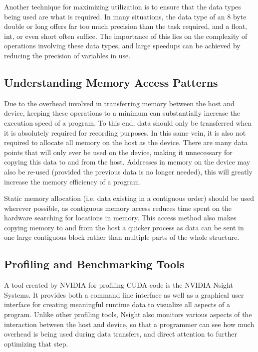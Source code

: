 \documentclass[11pt]{report}
\begin{document}
    Another technique for maximizing utilization is to ensure that the data types being used are what is required. In many situations, the data type of an 8 byte double or long offers far too much precision than the task required, and a float, int, or even short often suffice. The importance of this lies on the complexity of operations involving these data types, and large speedups can be achieved by reducing the precision of variables in use.
    
    \subsection{Understanding Memory Access Patterns}
    Due to the overhead involved in transferring memory between the host and device, keeping these operations to a minimum can substantially increase the execution speed of a program. To this end, data should only be transferred when it is absolutely required for recording purposes. In this same vein, it is also not required to allocate all memory on the host as the device. There are many data points that will only ever be used on the device, making it unnecessary for copying this data to and from the host. Addresses in memory on the device may also be re-used (provided the previous data is no longer needed), this will greatly increase the memory efficiency of a program.

    Static memory allocation (i.e. data existing in a contiguous order) should be used wherever possible, as contiguous memory access reduces time spent on the hardware searching for locations in memory. This access method also makes copying memory to and from the host a quicker process as data can be sent in one large contiguous block rather than multiple parts of the whole structure.
    
    \subsection{Profiling and Benchmarking Tools}
    A tool created by NVIDIA for profiling CUDA code is the NVIDIA Nsight Systems. It provides both a command line interface as well as a graphical user interface for creating meaningful runtime data to visualize all aspects of a program\cite{NSIGHT_USER_GUIDE}. Unlike other profiling tools, Nsight also monitors various aspects of the interaction between the host and device, so that a programmer can see how much overhead is being used during data transfers, and direct attention to further optimizing that step.
\end{document}
